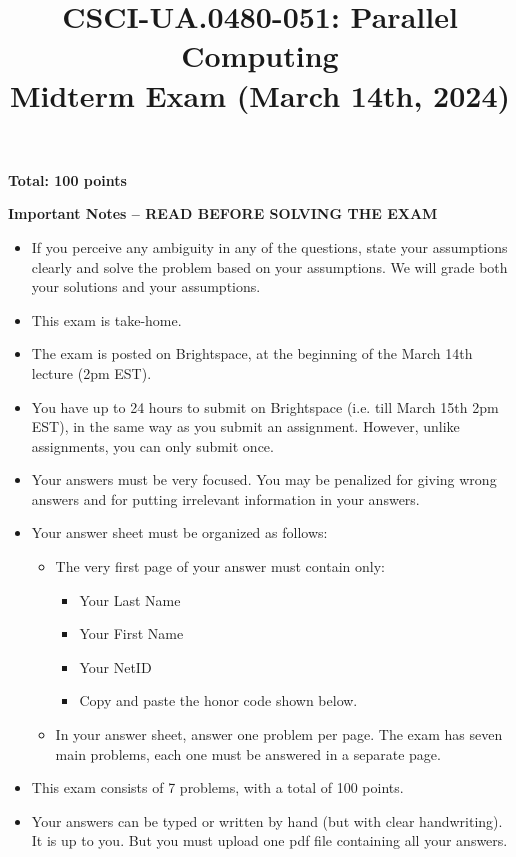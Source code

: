 \documentclass{article}
\begin{document}
\title{CSCI-UA.0480-051: Parallel Computing \\ Midterm Exam (March 14th, 2024)}
\author{}
\date{}
\maketitle

\textbf{Total: 100 points}

\textbf{Important Notes -- READ BEFORE SOLVING THE EXAM}

\begin{itemize}
    \item If you perceive any ambiguity in any of the questions, state your assumptions clearly and solve the problem based on your assumptions. We will grade both your solutions and your assumptions.
    \item This exam is take-home.
    \item The exam is posted on Brightspace, at the beginning of the March 14th lecture (2pm EST).
    \item You have up to 24 hours to submit on Brightspace (i.e. till March 15th 2pm EST), in the same way as you submit an assignment. However, unlike assignments, you can only submit once.
    \item Your answers must be very focused. You may be penalized for giving wrong answers and for putting irrelevant information in your answers.
    \item Your answer sheet must be organized as follows:
    \begin{itemize}
        \item The very first page of your answer must contain only:
        \begin{itemize}
            \item Your Last Name
            \item Your First Name
            \item Your NetID
            \item Copy and paste the honor code shown below.
        \end{itemize}
        \item In your answer sheet, answer one problem per page. The exam has seven main problems, each one must be answered in a separate page.
    \end{itemize}
    \item This exam consists of 7 problems, with a total of 100 points.
    \item Your answers can be typed or written by hand (but with clear handwriting). It is up to you. But you must upload one pdf file containing all your answers.
\end{itemize}
\end{document}
